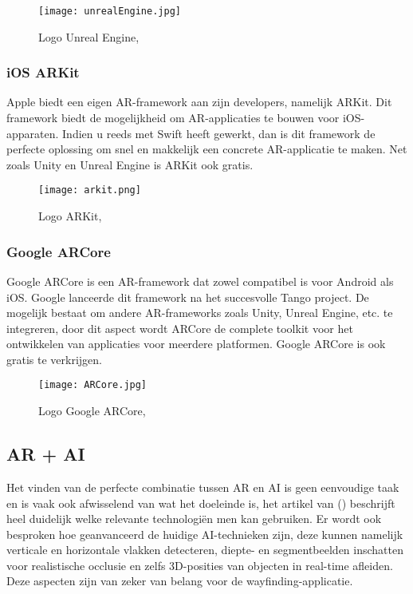 \begin{figure}[H]
	\centering
	\texttt{[image: unrealEngine.jpg]}
	\caption{Logo Unreal Engine, \autocite{UnrealEngine2019}}
\end{figure}

\subsubsection{iOS ARKit}
Apple biedt een eigen AR-framework aan zijn developers, namelijk ARKit. Dit framework biedt de mogelijkheid om AR-applicaties te bouwen voor iOS-apparaten. Indien u reeds met Swift heeft gewerkt, dan is dit framework de perfecte oplossing om snel en makkelijk een concrete AR-applicatie te maken. Net zoals Unity en Unreal Engine is ARKit ook gratis.
\begin{figure}[H]
	\centering
	\texttt{[image: arkit.png]}
	\caption{Logo ARKit, \autocite{Apple2019}}
\end{figure}

\subsubsection{Google ARCore}
Google ARCore is een AR-framework dat zowel compatibel is voor Android als iOS. Google lanceerde dit framework na het succesvolle Tango project.
De mogelijk bestaat om andere AR-frameworks zoals Unity, Unreal Engine, etc.  te integreren, door dit aspect wordt ARCore de complete toolkit voor het ontwikkelen van applicaties voor meerdere platformen. Google ARCore is ook gratis te verkrijgen.

\begin{figure}[H]
	\centering
	\texttt{[image: ARCore.jpg]}
	\caption{Logo Google ARCore, \autocite{ARCore2019}}
\end{figure}

\subsection{AR + AI}
Het vinden van de perfecte combinatie tussen AR en AI is geen eenvoudige taak en is vaak ook afwisselend van wat het doeleinde is, het artikel van \textcite{Toole2019} () beschrijft heel duidelijk welke relevante technologiën men kan gebruiken. Er wordt ook besproken hoe geanvanceerd de huidige AI-technieken zijn, deze kunnen namelijk  verticale en horizontale vlakken detecteren, diepte- en segmentbeelden inschatten voor realistische occlusie en zelfs 3D-posities van objecten in real-time afleiden. Deze aspecten zijn van zeker van belang voor de wayfinding-applicatie.


